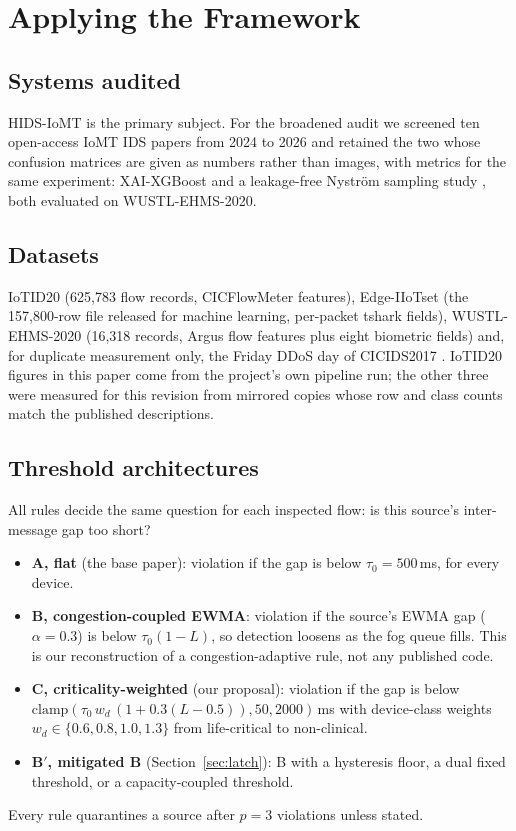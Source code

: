 \section{Applying the Framework}\label{sec:setup}

\subsection{Systems audited}
\noindent HIDS-IoMT \cite{berguiga2025} is the primary subject. For the broadened audit we screened ten open-access IoMT IDS papers from 2024 to 2026 and retained the two whose confusion matrices are given as numbers rather than images, with metrics for the same experiment: XAI-XGBoost \cite{hosain2025} and a leakage-free Nyström sampling study \cite{tarish2026}, both evaluated on WUSTL-EHMS-2020.

\subsection{Datasets}
\noindent IoTID20 \cite{ullah2020} (625,783 flow records, CICFlowMeter features), Edge-IIoTset \cite{ferrag2022} (the 157,800-row file released for machine learning, per-packet tshark fields), WUSTL-EHMS-2020 \cite{wustl} (16,318 records, Argus flow features plus eight biometric fields) and, for duplicate measurement only, the Friday DDoS day of CICIDS2017 \cite{sharafaldin2018}. IoTID20 figures in this paper come from the project's own pipeline run; the other three were measured for this revision from mirrored copies whose row and class counts match the published descriptions.

\subsection{Threshold architectures}
\noindent All rules decide the same question for each inspected flow: is this source's inter-message gap too short?
\begin{itemize}[leftmargin=1.2em,itemsep=1pt,topsep=2pt]
\item \textbf{A, flat} (the base paper): violation if the gap is below $\tau_0 = 500$\,ms, for every device.
\item \textbf{B, congestion-coupled EWMA}: violation if the source's EWMA gap ($\alpha = 0.3$) is below $\tau_0(1-L)$, so detection loosens as the fog queue fills. This is our reconstruction of a congestion-adaptive rule, not any published code.
\item \textbf{C, criticality-weighted} (our proposal): violation if the gap is below $\mathrm{clamp}(\tau_0\, w_d\, (1 + 0.3(L-0.5)), 50, 2000)$\,ms with device-class weights $w_d \in \{0.6, 0.8, 1.0, 1.3\}$ from life-critical to non-clinical.
\item \textbf{B$'$, mitigated B} (Section~\ref{sec:latch}): B with a hysteresis floor, a dual fixed threshold, or a capacity-coupled threshold.
\end{itemize}
Every rule quarantines a source after $p = 3$ violations unless stated.

